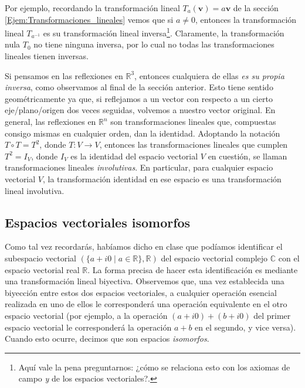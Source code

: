 \documentclass[12pt]{article}
\begin{document}
Por ejemplo, recordando  la transformación lineal $T_a(\mathbf{v})=a\mathbf{v}$ de la sección \ref{Ejem:Transformaciones_lineales} vemos que si $a\neq 0$, entonces la transformación lineal $T_{a^{-1}}$ es su transformación lineal inversa\footnote{Aquí vale la pena preguntarnos: ¿cómo se relaciona esto con los axiomas de campo \emph{y} de los espacios vectoriales?.}. Claramente, la transformación nula $T_0$ no tiene ninguna inversa, por lo cual no todas las transformaciones lineales tienen inversas. 

Si pensamos en las reflexiones en $\mathbb{R}^3$, entonces cualquiera de ellas \emph{es su propia inversa}, como observamos al final de la sección anterior. Esto tiene sentido geométricamente ya que, si reflejamos a un vector con respecto a un cierto eje/plano/origen dos veces seguidas, volvemos a nuestro vector original. En general, las reflexiones en $\mathbb{R}^n$ son transformaciones lineales que, compuestas consigo mismas en cualquier orden, dan la identidad. Adoptando la notación $T\circ T=T^2$, donde $T:V\to V$, entonces las transformaciones lineales que cumplen $T^2=I_V$, donde $I_V$ es la identidad del espacio vectorial $V$ en cuestión, se llaman transformaciones lineales \emph{involutivas}. En particular, para cualquier espacio vectorial $V$, la transformación identidad en ese espacio es una transformación lineal involutiva.

\subsection{Espacios vectoriales isomorfos}

Como tal vez recordarás, habíamos dicho en clase que podíamos identificar el subespacio vectorial $(\{a+i0\mid a\in\mathbb{R}\},\mathbb{R})$ del espacio vectorial complejo $\mathbb{C}$ con el espacio vectorial real $\mathbb{R}$. La forma precisa de hacer esta identificación es mediante una transformación lineal biyectiva. Observemos que, una vez establecida una biyección entre estos dos espacios vectoriales, a cualquier operación esencial realizada en uno de ellos le corresponderá una operación equivalente en el otro espacio vectorial (por ejemplo, a la operación $(a+i0)+(b+i0)$ del primer espacio vectorial le corresponderá la operación $a+b$ en el segundo, y vice versa). Cuando esto ocurre, decimos que son espacios \emph{isomorfos}.
\end{document}

